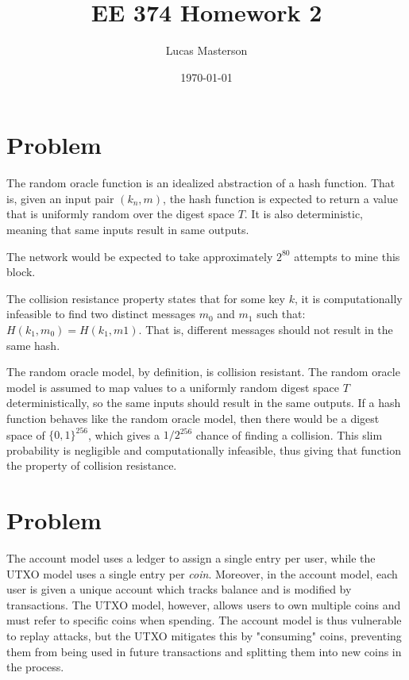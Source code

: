 \documentclass[11pt]{article}
\title{EE 374 Homework 2}
\author{Lucas Masterson}
\date{\today}
\begin{document}
\maketitle


\renewcommand{\thep}{\thesection.\alph{p}}


\section{Problem}

\begin{p}\end{p}
The random oracle function is an idealized abstraction of a hash function. That is, given an input pair $(k_n, m)$, the hash function is expected to return a value that is uniformly random over the digest space $T$. It is also deterministic, meaning that same inputs result in same outputs.

\begin{p}\end{p}
The network would be expected to take approximately $2^{80}$ attempts to mine this block.

\begin{p}\end{p}
The collision resistance property states that for some key $k$, it is computationally infeasible to find two distinct messages $m_0$ and $m_1$ such that: $H(k_1, m_0) = H(k_1, m1)$. That is, different messages should not result in the same hash.

\begin{p}\end{p}
The random oracle model, by definition, is collision resistant. The random oracle model is assumed to map values to a uniformly random digest space $T$ deterministically, so the same inputs should result in the same outputs. If a hash function behaves like the random oracle model, then there would be a digest space of $\{0,1\}^{256}$, which gives a $1/2^{256}$ chance of finding a collision. This slim probability is negligible and computationally infeasible, thus giving that function the property of collision resistance.


\section{Problem}
The account model uses a ledger to assign a single entry per user, while the UTXO model uses a single entry per \textit{coin}. Moreover, in the account model, each user is given a unique account which tracks balance and is modified by transactions. The UTXO model, however, allows users to own multiple coins and must refer to specific coins when spending. The account model is thus vulnerable to replay attacks, but the UTXO mitigates this by "consuming" coins, preventing them from being used in future transactions and splitting them into new coins in the process.
\end{document}
